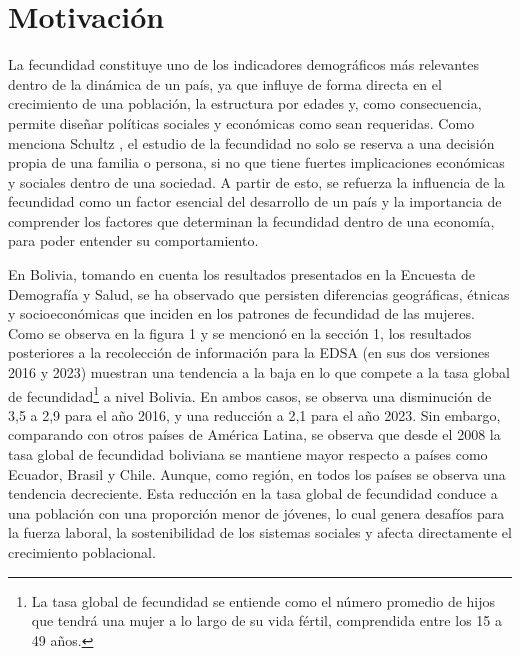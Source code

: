 \documentclass[Royal,times,sageh]{sagej}
\begin{document}
\section{Motivación}\label{motivaciuxf3n}

La fecundidad constituye uno de los indicadores demográficos más
relevantes dentro de la dinámica de un país, ya que influye de forma
directa en el crecimiento de una población, la estructura por edades y,
como consecuencia, permite diseñar políticas sociales y económicas como
sean requeridas. Como menciona Schultz \citep{schultz2006fertility}, el
estudio de la fecundidad no solo se reserva a una decisión propia de una
familia o persona, si no que tiene fuertes implicaciones económicas y
sociales dentro de una sociedad. A partir de esto, se refuerza la
influencia de la fecundidad como un factor esencial del desarrollo de un
país y la importancia de comprender los factores que determinan la
fecundidad dentro de una economía, para poder entender su
comportamiento.

En Bolivia, tomando en cuenta los resultados presentados en la Encuesta
de Demografía y Salud, se ha observado que persisten diferencias
geográficas, étnicas y socioeconómicas que inciden en los patrones de
fecundidad de las mujeres. Como se observa en la figura 1 y se mencionó
en la sección 1, los resultados posteriores a la recolección de
información para la EDSA (en sus dos versiones 2016 y 2023) muestran una
tendencia a la baja en lo que compete a la tasa global de
fecundidad\footnote{La tasa global de fecundidad se entiende como el
  número promedio de hijos que tendrá una mujer a lo largo de su vida
  fértil, comprendida entre los 15 a 49 años.} a nivel Bolivia. En ambos
casos, se observa una disminución de 3,5 a 2,9 para el año 2016, y una
reducción a 2,1 para el año 2023. Sin embargo, comparando con otros
países de América Latina, se observa que desde el 2008 la tasa global de
fecundidad boliviana se mantiene mayor respecto a países como Ecuador,
Brasil y Chile. Aunque, como región, en todos los países se observa una
tendencia decreciente. Esta reducción en la tasa global de fecundidad
conduce a una población con una proporción menor de jóvenes, lo cual
genera desafíos para la fuerza laboral, la sostenibilidad de los
sistemas sociales y afecta directamente el crecimiento poblacional.
\end{document}
